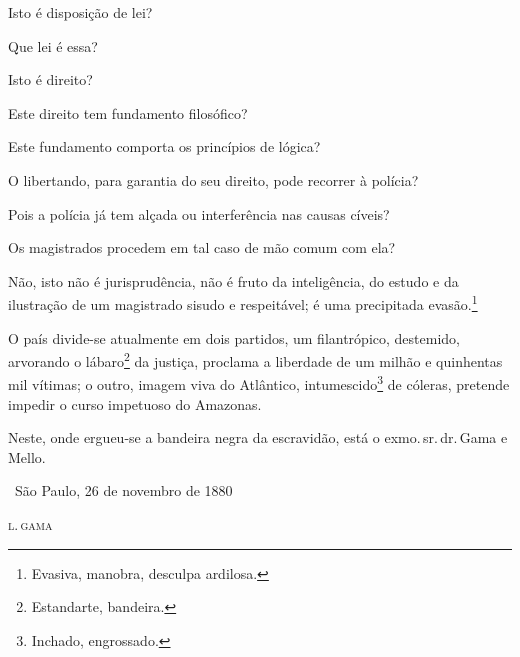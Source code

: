 Isto é disposição de lei?

Que lei é essa?

Isto é direito?

Este direito tem fundamento filosófico?

Este fundamento comporta os princípios de lógica?

O libertando, para garantia do seu direito, pode recorrer à polícia?

Pois a polícia já tem alçada ou interferência nas causas cíveis?

Os magistrados procedem em tal caso de mão comum com ela?

Não, isto não é jurisprudência, não é fruto da inteligência, do estudo e
da ilustração de um magistrado sisudo e respeitável; é uma precipitada
evasão.\footnote{Evasiva, manobra, desculpa ardilosa.}

O país divide-se atualmente em dois partidos, um filantrópico,
destemido, arvorando o lábaro\footnote{Estandarte, bandeira.} da
justiça, proclama a liberdade de um milhão e quinhentas mil vítimas; o
outro, imagem viva do Atlântico, intumescido\footnote{Inchado,
  engrossado.} de cóleras,
pretende impedir o curso impetuoso do Amazonas.

Neste, onde ergueu-se a bandeira negra da escravidão, está o exmo.\,sr.\,dr.\,Gama e Mello.

\medskip

\hfill\ São Paulo, 26 de novembro de 1880

\hfill\textsc{l.\,gama}


